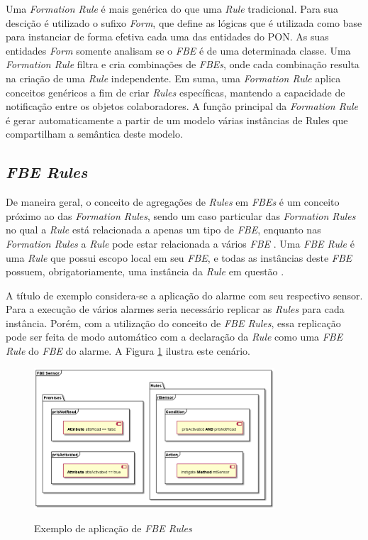 Uma \textit{Formation Rule} é mais genérica do que uma \textit{Rule}
tradicional. Para sua descição é utilizado o sufixo \textit{Form}, que define as
lógicas que é utilizada como base para instanciar de forma efetiva cada uma das
entidades do PON. As suas entidades \textit{Form} somente analisam se o
\textit{FBE} é de uma determinada classe. Uma \textit{Formation Rule} filtra e
cria combinações de \textit{FBEs}, onde cada combinação resulta na criação de
uma \textit{Rule} independente. Em suma, uma \textit{Formation Rule} aplica
conceitos genéricos a fim de criar \textit{Rules} específicas, mantendo a
capacidade de notificação entre os objetos colaboradores. A função principal da
\textit{Formation Rule} é gerar automaticamente a partir de um modelo várias
instâncias de Rules que compartilham a semântica deste modelo. 


\subsection{\textit{FBE Rules}}\label{sec:fbe_rule}

De maneira geral, o conceito de agregações de \textit{Rules} em \textit{FBEs} é
um conceito próximo ao das \textit{Formation Rules}, sendo um caso particular
das \textit{Formation Rules} no qual a \textit{Rule} está relacionada a apenas
um tipo de \textit{FBE}, enquanto nas \textit{Formation Rules} a \textit{Rule}
pode estar relacionada a vários \textit{FBE} \cite{msc_santos_2017}. Uma
\textit{FBE Rule} é uma \textit{Rule} que possui escopo local em seu
\textit{FBE}, e todas as instâncias deste \textit{FBE} possuem,
obrigatoriamente, uma instância da \textit{Rule} em questão
\cite{doc_ronszcka_2019}.

A título de exemplo considera-se a aplicação do alarme com seu respectivo
sensor. Para a execução de vários alarmes seria necessário replicar as
\textit{Rules} para cada instância. Porém, com a utilização do conceito de
\textit{FBE Rules}, essa replicação pode ser feita de modo automático com a
declaração da \textit{Rule} como uma \textit{FBE Rule} do \textit{FBE} do
alarme. A Figura \ref{fig:fbe_rule} ilustra este cenário.

\begin{figure}[!htb]
  \centering
  \caption{Exemplo de aplicação de \textit{FBE Rules}}
  \includegraphics[width=0.8\textwidth]{../out/diagrams/fbe_rule/rules.png}
  \smallskip
  \label{fig:fbe_rule}
\end{figure}

